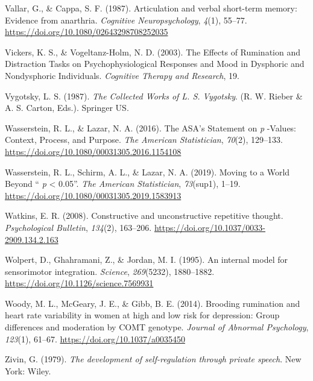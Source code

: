\documentclass[a4paper,12pt,twoside,openright,oldfontcommands]{memoir}
\begin{document}
\hypertarget{ref-vallar_articulation_1987}{}
Vallar, G., \& Cappa, S. F. (1987). Articulation and verbal short-term
memory: Evidence from anarthria. \emph{Cognitive Neuropsychology},
\emph{4}(1), 55--77. \url{https://doi.org/10.1080/02643298708252035}

\hypertarget{ref-vickers_effects_2003}{}
Vickers, K. S., \& Vogeltanz-Holm, N. D. (2003). The Effects of
Rumination and Distraction Tasks on Psychophysiological Responses and
Mood in Dysphoric and Nondysphoric Individuals. \emph{Cognitive Therapy
and Research}, 19.

\hypertarget{ref-vygotsky_collected_1987}{}
Vygotsky, L. S. (1987). \emph{The Collected Works of L. S. Vygotsky}.
(R. W. Rieber \& A. S. Carton, Eds.). Springer US.

\hypertarget{ref-wasserstein_asas_2016}{}
Wasserstein, R. L., \& Lazar, N. A. (2016). The ASA's Statement on
\emph{p} -Values: Context, Process, and Purpose. \emph{The American
Statistician}, \emph{70}(2), 129--133.
\url{https://doi.org/10.1080/00031305.2016.1154108}

\hypertarget{ref-wasserstein_moving_2019}{}
Wasserstein, R. L., Schirm, A. L., \& Lazar, N. A. (2019). Moving to a
World Beyond `` \emph{p} \textless{} 0.05''. \emph{The American
Statistician}, \emph{73}(sup1), 1--19.
\url{https://doi.org/10.1080/00031305.2019.1583913}

\hypertarget{ref-Watkins2008}{}
Watkins, E. R. (2008). Constructive and unconstructive repetitive
thought. \emph{Psychological Bulletin}, \emph{134}(2), 163--206.
\url{https://doi.org/10.1037/0033-2909.134.2.163}

\hypertarget{ref-wolpert_internal_1995}{}
Wolpert, D., Ghahramani, Z., \& Jordan, M. I. (1995). An internal model
for sensorimotor integration. \emph{Science}, \emph{269}(5232),
1880--1882. \url{https://doi.org/10.1126/science.7569931}

\hypertarget{ref-woody_brooding_2014}{}
Woody, M. L., McGeary, J. E., \& Gibb, B. E. (2014). Brooding rumination
and heart rate variability in women at high and low risk for depression:
Group differences and moderation by COMT genotype. \emph{Journal of
Abnormal Psychology}, \emph{123}(1), 61--67.
\url{https://doi.org/10.1037/a0035450}

\hypertarget{ref-zivin_development_1979}{}
Zivin, G. (1979). \emph{The development of self-regulation through
private speech}. New York: Wiley.
\end{document}
